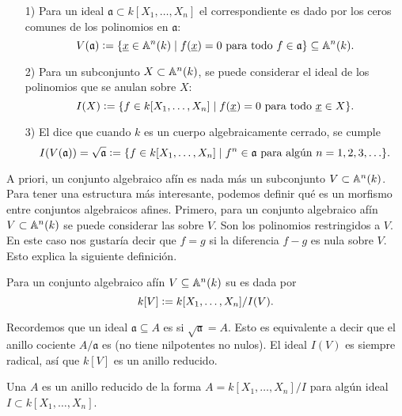 \documentclass{article}
\numberwithin{equation}{section}
\theoremstyle{definition}
\begin{document}
\begin{enumerate}
\item[1)] Para un ideal $\mathfrak{a} \subset k [X_1,\ldots,X_n]$
  el  correspondiente es dado por los ceros
  comunes de los polinomios en $\mathfrak{a}$:
  $$V (\mathfrak{a}) \dfn \{ \underline{x} \in \AA^n (k) \mid f (\underline{x}) = 0 \text{ para todo } f\in \mathfrak{a} \} \subseteq \AA^n (k).$$

\item[2)] Para un subconjunto $X \subset \AA^n (k)$, se puede considerar el
  ideal de los polinomios que se anulan sobre $X$:
  $$I (X) \dfn \{ f\in k[X_1,\ldots,X_n] \mid f (\underline{x}) = 0 \text{ para todo }\underline{x}\in X \}.$$

\item[3)] El  dice que cuando $k$ es un
  cuerpo algebraicamente cerrado, se cumple
  $$I (V (\mathfrak{a})) = \sqrt{\mathfrak{a}} \dfn \{ f\in k[X_1,\ldots,X_n] \mid f^n \in \mathfrak{a}\text{ para algún }n = 1,2,3,\ldots \}.$$
\end{enumerate}

A priori, un conjunto algebraico afín es nada más un subconjunto
$V\subset \AA^n (k)$. Para tener una estructura más interesante, podemos definir
qué es un morfismo entre conjuntos algebraicos afines. Primero, para un conjunto
algebraico afín $V\subset \AA^n (k)$ se puede considerar las
 sobre $V$. Son los polinomios restringidos a
$V$. En este caso nos gustaría decir que $f = g$ si la diferencia $f-g$ es nula
sobre $V$. Esto explica la siguiente definición.

\begin{definicion}
  Para un conjunto algebraico afín $V \subseteq \AA^n (k)$ su  es dada por
  $$k [V] \dfn k [X_1,\ldots,X_n]/I (V).$$
\end{definicion}

Recordemos que un ideal $\mathfrak{a} \subseteq A$ es  si
$\sqrt{\mathfrak{a}} = A$. Esto es equivalente a decir que el anillo cociente
$A/\mathfrak{a}$ es  (no tiene nilpotentes no nulos). El ideal
$I (V)$ es siempre radical, así que $k [V]$ es un anillo reducido.

\begin{definicion}
  Una  $A$ es un anillo reducido de la forma
  $A = k [X_1,\ldots,X_n] / I$ para algún ideal $I \subset k [X_1,\ldots,X_n]$.
\end{definicion}
\end{document}
